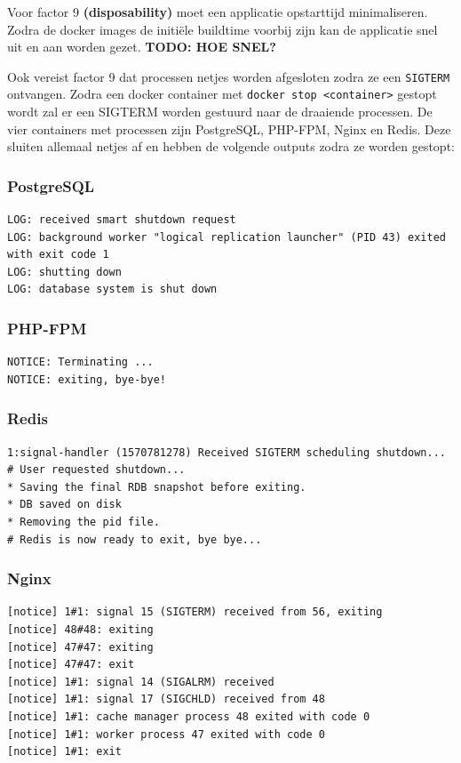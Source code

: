 Voor factor 9 \textbf{(disposability)} moet een applicatie opstarttijd minimaliseren. Zodra de docker images de initiële buildtime voorbij zijn kan de applicatie snel uit en aan worden gezet. \textbf{TODO: HOE SNEL?} %

Ook vereist factor 9 dat processen netjes worden afgesloten zodra ze een \texttt{SIGTERM} ontvangen. Zodra een docker container met \texttt{docker stop <container>} gestopt wordt zal er een SIGTERM worden gestuurd naar de draaiende processen. De vier containers met processen zijn PostgreSQL, PHP-FPM, Nginx en Redis. Deze sluiten allemaal netjes af en hebben de volgende outputs zodra ze worden gestopt:

\subsubsection{PostgreSQL}
\begin{verbatim}
LOG: received smart shutdown request
LOG: background worker "logical replication launcher" (PID 43) exited with exit code 1
LOG: shutting down
LOG: database system is shut down
\end{verbatim}

\subsubsection{PHP-FPM}
\begin{verbatim}
NOTICE: Terminating ...
NOTICE: exiting, bye-bye!
\end{verbatim}

\subsubsection{Redis}
\begin{verbatim}
1:signal-handler (1570781278) Received SIGTERM scheduling shutdown...
# User requested shutdown...
* Saving the final RDB snapshot before exiting.
* DB saved on disk
* Removing the pid file.
# Redis is now ready to exit, bye bye...
\end{verbatim}

\subsubsection{Nginx}
\begin{verbatim}
[notice] 1#1: signal 15 (SIGTERM) received from 56, exiting
[notice] 48#48: exiting
[notice] 47#47: exiting
[notice] 47#47: exit
[notice] 1#1: signal 14 (SIGALRM) received
[notice] 1#1: signal 17 (SIGCHLD) received from 48
[notice] 1#1: cache manager process 48 exited with code 0
[notice] 1#1: worker process 47 exited with code 0
[notice] 1#1: exit
\end{verbatim}


